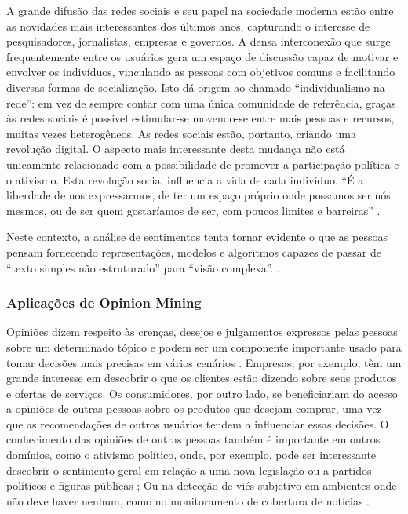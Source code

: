 \documentclass[
	12pt,				%
	openright,			%
	oneside,			%
	a4paper,			%
	english,			%
	spanish,			%
	brazil				%
	]{abntex2}
\begin{document}
A grande difusão das redes sociais e seu papel na sociedade moderna estão entre as novidades mais interessantes dos últimos anos, capturando o interesse de pesquisadores, jornalistas, empresas e governos. A densa interconexão que surge frequentemente entre os usuários gera um espaço de discussão capaz de motivar e envolver os indivíduos, vinculando as pessoas com objetivos comuns e facilitando diversas formas de socialização. Isto dá origem ao chamado ``individualismo na rede'': em vez de sempre contar com uma única comunidade de referência, graças às redes sociais é possível estimular-se movendo-se entre mais pessoas e recursos, muitas vezes heterogêneos. As redes sociais estão, portanto, criando uma revolução digital. O aspecto mais interessante desta mudança não está unicamente relacionado com a possibilidade de promover a participação política e o ativismo. Esta revolução social influencia a vida de cada indivíduo. ``É a liberdade de nos expressarmos, de ter um espaço próprio onde possamos ser nós mesmos, ou de ser quem gostaríamos de ser, com poucos limites e barreiras'' \cite{book_sentiment_social}.

Neste contexto, a análise de sentimentos tenta tornar evidente o que as pessoas pensam fornecendo representações, modelos e algoritmos capazes de passar de ``texto simples não estruturado''  para ``visão complexa''. \cite{book_sentiment_social}.

	\subsubsection*{Aplicações de Opinion Mining}
	
	Opiniões dizem respeito às crenças, desejos e julgamentos expressos pelas pessoas sobre um determinado tópico e podem ser um componente importante usado para tomar decisões mais precisas em vários cenários \cite{book_discover_practices}. Empresas, por exemplo, têm um grande interesse em descobrir o que os clientes estão dizendo sobre seus produtos e ofertas de serviços. Os consumidores, por outro lado, se beneficiariam do acesso a opiniões de outras pessoas sobre os produtos que desejam comprar, uma vez que as recomendações de outros usuários tendem a influenciar essas decisões. O conhecimento das opiniões de outras pessoas também é importante em outros domínios, como o ativismo político, onde, por exemplo, pode ser interessante descobrir o sentimento geral em relação a uma nova legislação ou a partidos políticos e figuras públicas \cite{book_political_opinion}; Ou na detecção de viés subjetivo em ambientes onde não deve haver nenhum, como no monitoramento de cobertura de notícias \cite{book_Cambria2015}.
\end{document}
